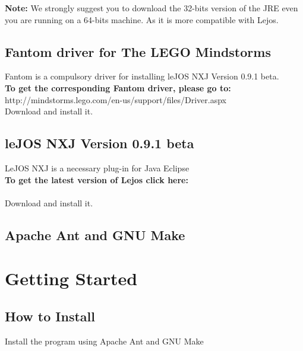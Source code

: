 \documentclass[11pt, a4paper]{report}
\begin{document}
\noindent\textbf{Note: } We strongly suggest you to download the 32-bits version of the JRE even you are running on a 64-bits machine. As it is more compatible with Lejos.\\[1cm]


\section {Fantom driver for The LEGO Mindstorms}
Fantom is a compulsory driver for installing leJOS NXJ Version 0.9.1 beta.\\
\noindent\textbf {To get the corresponding Fantom driver, please go to:} \\[0.2cm]
{\color{blue} http://mindstorms.lego.com/en-us/support/files/Driver.aspx} \\[0.5cm]
Download and install it.\\[1cm]

\section {leJOS NXJ Version 0.9.1 beta}
LeJOS NXJ is a necessary plug-in for Java Eclipse\\[0.2cm]
\textbf {To get the latest version of Lejos click here:}\\

\\[0.5cm]
Download and install it.\\[1cm]

\section {Apache Ant and GNU Make}


\chapter{Getting Started}

\section{How to Install}
Install the program using Apache Ant and GNU Make\\
\end{document}
